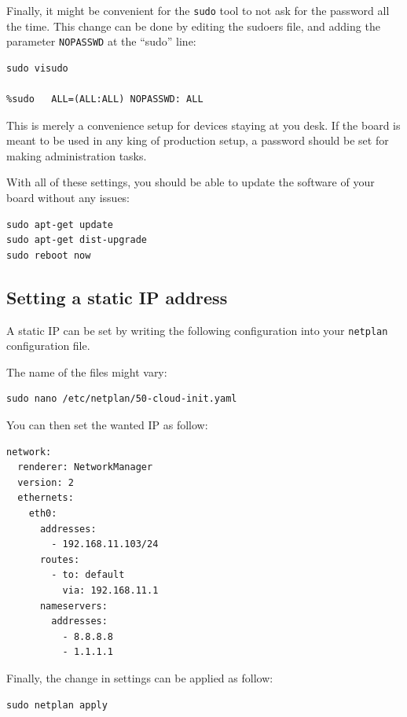 \documentclass[10pt]{article}
\begin{document}
Finally, it might be convenient for the \verb|sudo| tool to not ask for the
password all the time. This change can be done by editing the sudoers file, and
adding the parameter \verb|NOPASSWD|
at the ``sudo'' line:
\begin{tcolorbox}
\begin{verbatim}
sudo visudo

%sudo   ALL=(ALL:ALL) NOPASSWD: ALL
\end{verbatim}
\end{tcolorbox}

This is merely a convenience setup for devices staying at you desk. If
the board is meant to be used in any king of production setup, a password
should be set for making administration tasks.

With all of these settings, you should be able to update the software of your
board without any issues:
\begin{tcolorbox}
\begin{verbatim}
sudo apt-get update
sudo apt-get dist-upgrade
sudo reboot now
\end{verbatim}
\end{tcolorbox}


\subsection{Setting a static IP address}
A static IP can be set by writing the following
configuration into your \verb|netplan| configuration file.

The name of the files might vary:
\begin{tcolorbox}
\begin{verbatim}
sudo nano /etc/netplan/50-cloud-init.yaml
\end{verbatim}
\end{tcolorbox}

You can then set the wanted IP as follow:
\begin{tcolorbox}
\begin{verbatim}
network:
  renderer: NetworkManager
  version: 2
  ethernets:
    eth0:
      addresses:
        - 192.168.11.103/24
      routes:
        - to: default
          via: 192.168.11.1
      nameservers:
        addresses:
          - 8.8.8.8
          - 1.1.1.1
\end{verbatim}
\end{tcolorbox}

Finally, the change in settings can be applied
as follow:
\begin{tcolorbox}
\begin{verbatim}
sudo netplan apply
\end{verbatim}
\end{tcolorbox}
\end{document}

